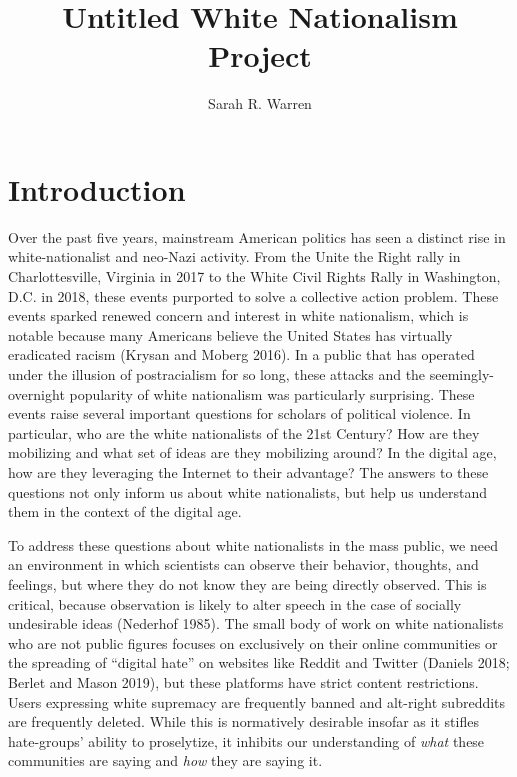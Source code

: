 \documentclass[12pt]{paper}
\title{Untitled White Nationalism Project}
\author{Sarah R. Warren}
\date{}
\begin{document}
\maketitle

\doublespacing
\section*{Introduction}
Over the past five years, mainstream American politics has seen a distinct rise in white-nationalist and neo-Nazi activity. From the Unite the Right rally in Charlottesville, Virginia in 2017 to the White Civil Rights Rally in Washington, D.C. in 2018, these events purported to solve a collective action problem. These events sparked renewed concern and interest in white nationalism, which is notable because many Americans believe the United States has virtually eradicated racism (Krysan and Moberg 2016). In a public that has operated under the illusion of postracialism for so long, these attacks and the seemingly-overnight popularity of white nationalism was particularly surprising. These events raise several important questions for scholars of political violence. In particular, who are the white nationalists of the 21st Century? How are they mobilizing and what set of ideas are they mobilizing around? In the digital age, how are they leveraging the Internet to their advantage? The answers to these questions not only inform us about white nationalists, but help us understand them in the context of the digital age.

To address these questions about white nationalists in the mass public, we need an environment in which scientists can observe their behavior, thoughts, and feelings, but where they do not know they are being directly observed. This is critical, because observation is likely to alter speech in the case of socially undesirable ideas (Nederhof 1985). The small body of work on white nationalists who are not public figures focuses on exclusively on their online communities or the spreading of “digital hate” on websites like Reddit and Twitter (Daniels 2018; Berlet and Mason 2019), but these platforms have strict content restrictions. Users expressing white supremacy are frequently banned and alt-right subreddits are frequently deleted. While this is normatively desirable insofar as it stifles hate-groups' ability to proselytize, it inhibits our understanding of \textit{what} these communities are saying and \textit{how} they are saying it.
\end{document}
